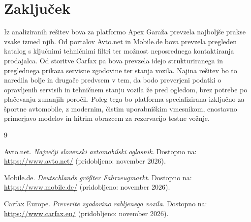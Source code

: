 \documentclass[a4paper,12pt]{article}
\begin{document}
\section{Zaključek}
Iz analiziranih rešitev bova za platformo Apex Garaža prevzela najboljše prakse vsake izmed njih. Od portalov Avto.net in Mobile.de bova prevzela pregleden katalog s ključnimi tehničnimi filtri ter možnost neposrednega kontaktiranja prodajalca. Od storitve Carfax pa bova prevzela idejo strukturiranega in preglednega prikaza servisne zgodovine ter stanja vozila. Najina rešitev bo to naredila bolje in drugače predvsem v tem, da bodo preverjeni podatki o opravljenih servisih in tehničnem stanju vozila že pred ogledom, brez potrebe po plačevanju zunanjih poročil. Poleg tega bo platforma specializirana izključno za športne avtomobile, z modernim, čistim uporabniškim vmesnikom, enostavno primerjavo modelov in hitrim obrazcem za rezervacijo testne vožnje.


\begin{thebibliography}{9}

Avto.net. \emph{Največji slovenski avtomobilski oglasnik}. Dostopno na: \url{https://www.avto.net/} (pridobljeno: november 2026).

Mobile.de. \emph{Deutschlands größter Fahrzeugmarkt}. Dostopno na: \url{https://www.mobile.de/} (pridobljeno: november 2026).

Carfax Europe. \emph{Preverite zgodovino rabljenega vozila}. Dostopno na: \url{https://www.carfax.eu/} (pridobljeno: november 2026).

\end{thebibliography}
\end{document}
